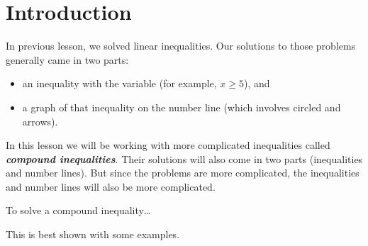 

\section*{Introduction}

In previous lesson, we solved linear inequalities. 
Our solutions to those problems generally came in two parts:
\begin{itemize}
    \item an inequality with the variable (for example, $x \geq 5$), and
    \item a graph of that inequality on the number line (which involves circled and arrows).
\end{itemize}



In this lesson we will be working with more complicated inequalities called
{\bfseries\itshape compound inequalities}.
Their solutions will also come in two parts (inequalities and number lines).
But since the problems are more complicated, the inequalities and number lines will also be more complicated.



\begin{myConceptSteps}{To solve a compound inequality\dots}
\end{myConceptSteps}

This is best shown with some examples.


